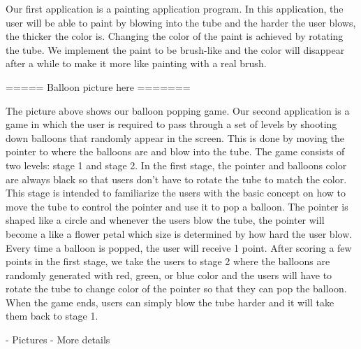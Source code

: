 Our first application is a painting application program. In this application, the user will be able to paint by blowing into the tube and the harder the user blows, the thicker the color is. Changing the color of the paint is achieved by rotating the tube. We implement the paint to be brush-like and the color will disappear after a while to make it more like painting with a real brush.


===== Balloon picture here =======

The picture above shows our balloon popping game. Our second application is a game in which the user is required to pass through a set of levels by shooting down balloons that randomly appear in the screen. This is done by moving the pointer to where the balloons are and blow into the tube. The game consists of two levels: stage 1 and stage 2. In the first stage, the pointer and balloons color are always black so that users don’t have to rotate the tube to match the color. This stage is intended to familiarize the users with the basic concept on how to move the tube to control the pointer and use it to pop a balloon. The pointer is shaped like a circle and whenever the users blow the tube, the pointer will become a like a flower petal which size is determined by how hard the user blow. Every time a balloon is popped, the user will receive 1 point. After scoring a few points in the first stage, we take the users to stage 2 where the balloons are randomly generated with red, green, or blue color and the users will have to rotate the tube to change color of the pointer so that they can pop the balloon. When the game ends, users can simply blow the tube harder and it will take them back to stage 1. 



\TODO
- Pictures \newline
- More details

